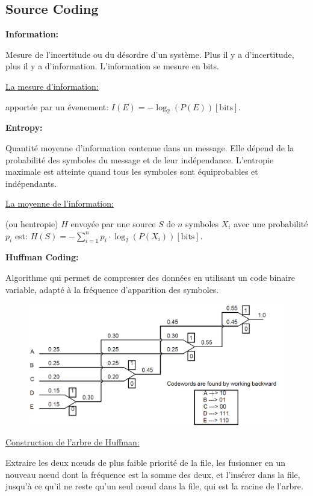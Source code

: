 \subsection*{Source Coding}
\textbf{Information:}

Mesure de l'incertitude ou du désordre d'un système. Plus il y a
d'incertitude, plus il y a d'information. L'information se mesure en bits.

\underline{La mesure d'information:}

apportée par un évenement: $I(E) = -\log_2(P(E))[\text{bits}]$.

\textbf{Entropy:}

Quantité moyenne d'information contenue dans un message. Elle dépend
de la probabilité des symboles du message et de leur indépendance. L'entropie maximale
est atteinte quand tous les symboles sont équiprobables et indépendants.

\underline{La moyenne de l'information:}

(ou hentropie) $H$ envoyée par une source $S$ de $n$ symboles
$X_i$ avec une probabilité $p_i$ est:
$H(S) = -\sum_{i=1}^{n}p_i\cdot\log_2(P(X_i))[\text{bits}]$.

\textbf{Huffman Coding:}

Algorithme qui permet de compresser des données en utilisant
un code binaire variable, adapté à la fréquence d'apparition des symboles.

\setlength{\intextsep}{-5pt}
\begin{figure}
    \includegraphics[width=\linewidth]{images/arbre_huffman.png}
\end{figure}
\underline{Construction de l'arbre de Huffman:}

Extraire les deux nœuds de plus faible
priorité de la file, les fusionner en un nouveau nœud dont la fréquence est la somme
des deux, et l'insérer dans la file, jusqu'à ce qu'il ne reste qu'un seul nœud dans
la file, qui est la racine de l'arbre.

